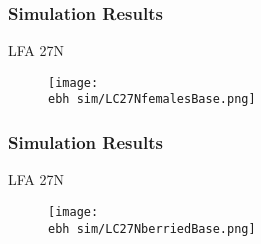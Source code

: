 \documentclass{beamer}
\newcommand{\ebh}{\string~/bio.data/bio.lobster/figures/LFA2733Framework2018/} %
\begin{document}



\begin{frame}
\frametitle{Simulation Results}
LFA 27N 
\begin{figure}
        \begin{center}
            \texttt{[image: \\ebh sim/LC27NfemalesBase.png]}
        \end{center}
    \end{figure}
\end{frame}




\begin{frame}
\frametitle{Simulation Results}
LFA 27N 
\begin{figure}
        \begin{center}
            \texttt{[image: \\ebh sim/LC27NberriedBase.png]}
        \end{center}
    \end{figure}
\end{frame}


\end{document}
